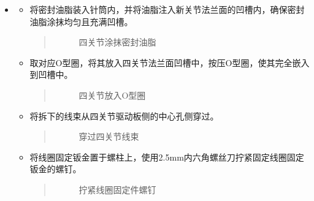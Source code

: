 \documentclass[a4paper,11pt,english,openany,oneside]{sphinxmanual}
\begin{document}
\sphinxAtStartPar
{}
\begin{itemize}
\item {} 
\sphinxAtStartPar
{}
\begin{itemize}
\item {} 
\sphinxAtStartPar
将密封油脂装入针筒内，并将油脂注入新关节法兰面的凹槽内，确保密封油脂涂抹均匀且充满凹槽。
\begin{quote}

\begin{figure}[H]
\centering
\capstart

\noindent{}
\caption{四关节涂抹密封油脂}\label{\detokenize{_u66f4_u6362_u5173_u8282:id83}}\end{figure}
\end{quote}

\item {} 
\sphinxAtStartPar
取对应O型圈，将其放入四关节法兰面凹槽中，按压O型圈，使其完全嵌入到凹槽中。
\begin{quote}

\begin{figure}[H]
\centering
\capstart

\noindent{}
\caption{四关节放入O型圈}\label{\detokenize{_u66f4_u6362_u5173_u8282:id84}}\end{figure}
\end{quote}

\item {} 
\sphinxAtStartPar
将拆下的线束从四关节驱动板侧的中心孔侧穿过。
\begin{quote}

\begin{figure}[H]
\centering
\capstart

\noindent{}
\caption{穿过四关节线束}\label{\detokenize{_u66f4_u6362_u5173_u8282:id85}}\end{figure}
\end{quote}

\item {} 
\sphinxAtStartPar
将线圈固定钣金置于螺柱上，使用2.5mm内六角螺丝刀拧紧固定线圈固定钣金的螺钉。
\begin{quote}

\begin{figure}[H]
\centering
\capstart

\noindent{}
\caption{拧紧线圈固定件螺钉}\label{\detokenize{_u66f4_u6362_u5173_u8282:id86}}\end{figure}
\end{quote}


\end{itemize}
\end{itemize}
\end{document}
